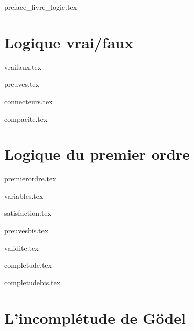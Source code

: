 \documentclass[10pt,twoside,openright]{report}
\begin{document}
\renewcommand{\contentsname}{Sommaire}

{preface_livre_logic.tex}
\debutchapitres
{}


\clearemptydoublepage


\part{Logique vrai/faux}

{vraifaux.tex}

{preuves.tex}

{connecteurs.tex}

{compacite.tex}


\clearemptydoublepage
\part{Logique du premier ordre}

{premierordre.tex}

{variables.tex}
	
{satisfaction.tex}

{preuvesbis.tex}

{validite.tex}

{completude.tex}

{completudebis.tex}	


\clearemptydoublepage
\part{L'incomplétude de Gödel}
\end{document}
